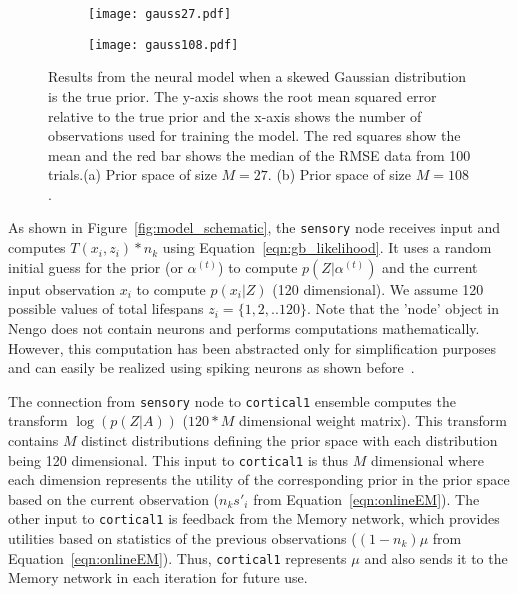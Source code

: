 \documentclass[10pt,letterpaper]{article}
\begin{document}
\begin{figure*}[h]
    \centering
    \begin{subfigure}{.43\textwidth}
        \texttt{[image: gauss27.pdf]}
        \label{fig:gauss27}
    \end{subfigure}
    \begin{subfigure}{.43\textwidth}
        \texttt{[image: gauss108.pdf]} 
        \label{fig:gauss108}
    \end{subfigure}
    \caption{Results from the neural model when a skewed Gaussian distribution is the true prior. The y-axis shows the root mean squared error relative to the true prior and the x-axis shows the number of observations used for training the model. The red squares show the mean and the red bar shows the median of the RMSE data from 100 trials.(a) Prior space of size $M=27$. (b) Prior space of size $M=108$. 
    }\label{fig:results_gauss}
\end{figure*}


As shown in Figure~\ref{fig:model_schematic}, the \texttt{sensory} node receives input and computes $T(x_i, z_i) * n_{k}$ using Equation~\ref{eqn:gb_likelihood}. It uses a random initial guess for the prior (or $\alpha^{(t)}$) to compute $p(Z | \alpha^{(t)})$ and the current input observation $x_i$ to compute $p(x_i | Z)$ (120 dimensional). We assume 120 possible values of total lifespans $z_i = \{1, 2, ..120\}$. Note that the 'node' object in Nengo does not contain neurons and performs computations mathematically. However, this computation has been abstracted only for simplification purposes and can easily be realized using spiking neurons as shown before~\cite{sharma2017}. 

The connection from \texttt{sensory} node to \texttt{cortical1} ensemble computes the transform $\log(p(Z | A))$ ($120 * M$ dimensional weight matrix). This transform contains $M$ distinct distributions defining the prior space with each distribution being 120 dimensional. This input to \texttt{cortical1} is thus $M$ dimensional where each dimension represents the utility of the corresponding prior in the prior space based on the current observation ($n_{k}s'_{i}$ from Equation~\ref{eqn:onlineEM}). The other input to \texttt{cortical1} is feedback from the Memory network, which provides utilities based on statistics of the previous observations ($(1-n_{k}) \mu$ from Equation~\ref{eqn:onlineEM}). Thus, \texttt{cortical1} represents $\mu$ and also sends it to the Memory network in each iteration for future use.
\end{document}
